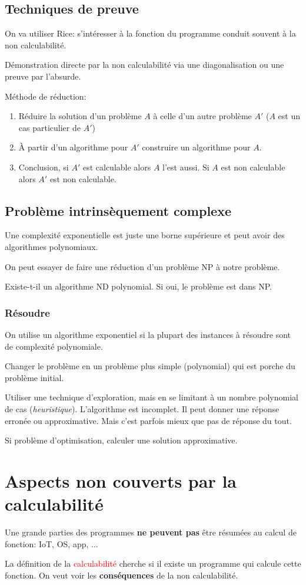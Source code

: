 \documentclass{report}
\begin{document}
\subsection{Techniques de preuve}
On va utiliser Rice: s'intéresser à la fonction du programme conduit souvent à la non calculabilité.\par 
Démonstration directe par la non calculabilité via une diagonalisation ou une preuve par l'absurde.\par 
Méthode de réduction:
\begin{enumerate}
	\item Réduire la solution d'un problème $A$ à celle d'un autre problème $A'$ ($A$ est un cas particulier de $A'$)
	\item À partir d'un algorithme pour $A'$ construire un algorithme pour $A$.
	\item Conclusion, si $A'$ est calculable alors $A$ l'est aussi. Si $A$ est non calculable alors $A'$ est non calculable.
\end{enumerate}

\subsection{Problème intrinsèquement complexe}
Une complexité exponentielle est juste une borne supérieure et peut avoir des algorithmes polynomiaux.\par 
On peut essayer de faire une réduction d'un problème NP à notre problème.\par 
Existe-t-il un algorithme ND polynomial. Si oui, le problème est dans NP.

\subsubsection{Résoudre}
On utilise un algorithme exponentiel si la plupart des instances à résoudre sont de complexité polynomiale.\par 
Changer le problème en un problème plus simple (polynomial) qui est porche du problème initial.\par 
Utiliser une technique d'exploration, mais en se limitant à un nombre polynomial de cas (\textit{heuristique}). L'algorithme est incomplet. Il peut donner une réponse erronée ou approximative. Mais c'est parfois mieux que pas de réponse du tout.\par 
Si problème d'optimisation, calculer une solution approximative.

\section{Aspects non couverts par la calculabilité}
Une grande parties des programmes \textbf{ne peuvent pas} être résumées au calcul de fonction: IoT, OS, app, ...\par
La définition de la \textcolor{red}{calculabilité} cherche si il existe un programme qui calcule cette fonction. On veut voir les \textbf{conséquences} de la non calculabilité.
\end{document}
